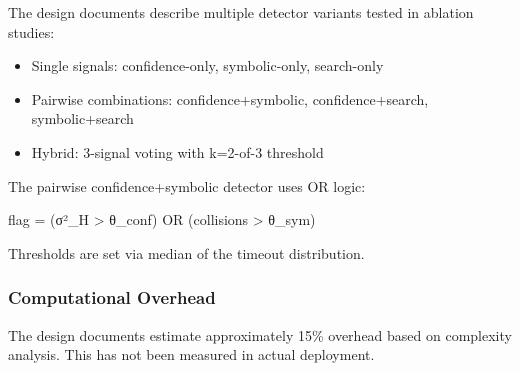 The design documents describe multiple detector variants tested in ablation studies:

\begin{itemize}
\item Single signals: confidence-only, symbolic-only, search-only
\item Pairwise combinations: confidence+symbolic, confidence+search, symbolic+search
\item Hybrid: 3-signal voting with k=2-of-3 threshold
\end{itemize}

The pairwise confidence+symbolic detector uses OR logic:

flag = (σ²_H > θ_conf) OR (collisions > θ_sym)

Thresholds are set via median of the timeout distribution.

\subsubsection{Computational Overhead}

The design documents estimate approximately 15\% overhead based on complexity analysis. This has not been measured in actual deployment.
